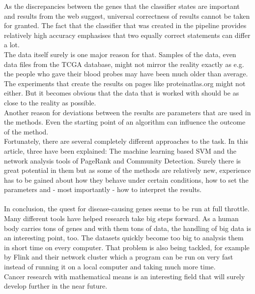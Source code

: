\documentclass{bioinfo}
\begin{document}
As the discrepancies between the genes that the classifier states are important and results from the web suggest, universal correctness of results cannot be taken for granted. The fact that the classifier that was created in the pipeline provides relatively high accuracy emphasises that two equally correct statements can differ a lot.\\
The data itself surely is one major reason for that. Samples of the data, even data files from the TCGA database, might not mirror the reality exactly as e.g. the people who gave their blood probes may have been much older than average. The experiments that create the results on pages like proteinatlas.org might not either. But it becomes obvious that the data that is worked with should be as close to the reality as possible.\\
Another reason for deviations between the results are parameters that are used in the methods. Even the starting point of an algorithm can influence the outcome of the method.\\
Fortunately, there are several completely different approaches to the task. In this article, three have been explained: The machine learning based SVM and the network analysis tools of PageRank and Community Detection. Surely there is great potential in them but as some of the methods are relatively new, experience has to be gained about how they behave under certain conditions, how to set the parameters and - most importantly - how to interpret the results.\\\\
In conclusion, the quest for disease-causing genes seems to be run at full throttle. Many different tools have helped research take big steps forward. As a human body carries tons of genes and with them tons of data, the handling of big data is an interesting point, too. The datasets quickly become too big to analysis them in short time on every computer. That problem is also being tackled, for example by Flink and their network cluster which a program can be run on very fast instead of running it on a local computer and taking much more time.\\
Cancer research with mathematical means is an interesting field that will surely develop further in the near future.



 

     
\end{document}
